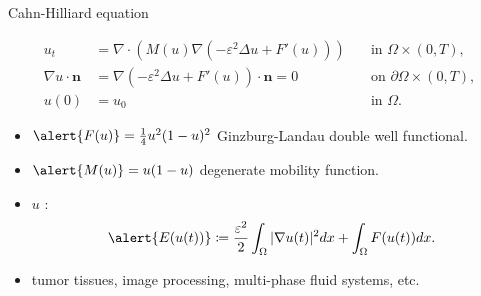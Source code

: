 \begin{frame}{Cahn-Hilliard equation}
	\begin{block}{}
		\vspace*{-0.4cm}
		\begin{equation*}
			\begin{aligned}
				u_t&= \nabla\cdot \left(M(u)\nabla\left(-\varepsilon^2\Delta u+F'(u)\right)\right)\quad&\text{in }\Omega\times(0,T),\\
				\nabla u\cdot \mathbf{n}&=\nabla(-\varepsilon^2\Delta u+F'(u))\cdot\mathbf{n}=0\quad&\text{on }\partial\Omega\times(0,T),\\
				u(0)&=u_0\quad&\text{in }\Omega.
			\end{aligned}
		\end{equation*}
	\end{block}
	\begin{itemize}
		\item $\alert{F(u)}=\frac{1}{4}u^2(1-u)^2$ Ginzburg-Landau double well functional.
		\item $\alert{M(u)}=u(1-u)$ degenerate mobility function.
		\item $u$ :
		$$\alert{E(u(t))}\coloneqq\frac{\varepsilon^2}{2}\int_\Omega|\nabla u(t)|^2dx+\int_\Omega F(u(t))dx.$$
		\item {} tumor tissues, image processing, multi-phase fluid systems, etc.
	\end{itemize}
\end{frame}


